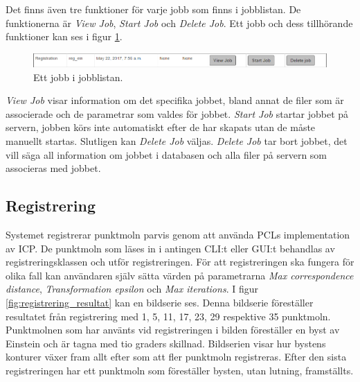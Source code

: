 Det finns även tre funktioner för varje jobb som finns i jobblistan. De funktionerna är \textit{View Job}, \textit{Start Job} och \textit{Delete Job}. Ett jobb och dess tillhörande funktioner kan ses i figur \ref{fig:3DCopyJobInList}.

\begin{figure}[H]
	\centering
	\includegraphics[width=130mm]{figures/3DCopyJobInList.PNG}
	\caption{Ett jobb i jobblistan.}
	\label{fig:3DCopyJobInList}
\end{figure}

\textit{View Job} visar information om det specifika jobbet, bland annat de filer som är associerade och de parametrar som valdes för jobbet. \textit{Start Job} startar jobbet på servern, jobben körs inte automatiskt efter de har skapats utan de måste manuellt startas. Slutligen kan \textit{Delete Job} väljas. \textit{Delete Job} tar bort jobbet, det vill säga all information om jobbet i databasen och alla filer på servern som associeras med jobbet.

\subsection{Registrering}
Systemet registrerar punktmoln parvis genom att använda PCLs implementation av ICP. De punktmoln som läses in i antingen CLI:t eller GUI:t behandlas av registreringsklassen och utför registreringen. För att registreringen ska fungera för olika fall kan användaren själv sätta värden på parametrarna \textit{Max correspondence distance}, \textit{Transformation epsilon} och \textit{Max iterations}. I figur \ref{fig:registrering_resultat} kan en bildserie ses. Denna bildserie föreställer resultatet från registrering med 1, 5, 11, 17, 23, 29 respektive 35 punktmoln. Punktmolnen som har använts vid registreringen i bilden föreställer en byst av Einstein och är tagna med tio graders skillnad. Bildserien visar hur bystens konturer växer fram allt efter som att fler punktmoln registreras. Efter den sista registreringen har ett punktmoln som föreställer bysten, utan lutning, framställts. 

